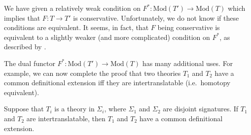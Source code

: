


\begin{disc} We have given a relatively weak condition on
  $F^*:\mathrm{Mod}(T')\to\mathrm{Mod}(T)$ which implies that
  $F:T\to T'$ is conservative.  Unfortunately, we do not know if these
  conditions are equivalent.  It seems, in fact, that $F$ being
  conservative is equivalent to a slightly weaker (and more
  complicated) condition on $F^*$, as described by
  \cite{breiner}.  \end{disc}

The dual functor $F^*:\mathrm{Mod}(T')\to \mathrm{Mod}(T)$ has many
additional uses.  For example, we can now complete the proof that two
theories $T_1$ and $T_2$ have a common definitional extension iff they
are intertranslatable (i.e.\ homotopy equivalent).

\begin{thm}[Barrett] Suppose that $T_i$ is a theory in $\Sigma _i$,
  where $\Sigma _1$ and $\Sigma _2$ are disjoint signatures.  If $T_1$
  and $T_2$ are intertranslatable, then $T_1$ and $T_2$ have a common
  definitional extension.  \label{it-cde} \end{thm}

